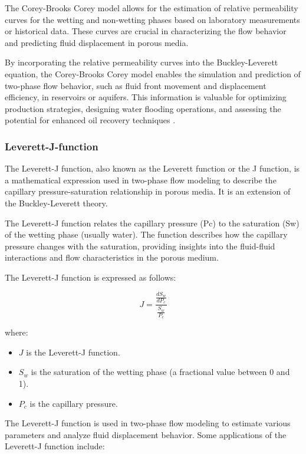 {\begin{itemize}
		\end{itemize}

		The Corey-Brooks Corey model allows for the estimation of relative permeability curves for the wetting and non-wetting phases based on laboratory measurements or historical data. These curves are crucial in characterizing the flow behavior and predicting fluid displacement in porous media.
		
		By incorporating the relative permeability curves into the Buckley-Leverett equation, the Corey-Brooks Corey model enables the simulation and prediction of two-phase flow behavior, such as fluid front movement and displacement efficiency, in reservoirs or aquifers. This information is valuable for optimizing production strategies, designing water flooding operations, and assessing the potential for enhanced oil recovery techniques \cite{tryggvason2001front}.

	\subsubsection{ Leverett-J-function}
		The Leverett-J function, also known as the Leverett function or the J function, is a mathematical expression used in two-phase flow modeling to describe the capillary pressure-saturation relationship in porous media. It is an extension of the Buckley-Leverett theory. 

		The Leverett-J function relates the capillary pressure (Pc) to the saturation (Sw) of the wetting phase (usually water). The function describes how the capillary pressure changes with the saturation, providing insights into the fluid-fluid interactions and flow characteristics in the porous medium.
		
		The Leverett-J function is expressed as follows:

		\[ J = \frac{{\frac{{dS_w}}{{dP_c}}}}{{\frac{{S_w}}{{P_c}}}} \]

		where:
		\begin{itemize}
			\item 	 \( J \) is the Leverett-J function.
			
			\item \( S_w \) is the saturation of the wetting phase (a fractional value between 0 and 1).
			
			\item \( P_c \) is the capillary pressure.
			
		\end{itemize}

		The Leverett-J function is used in two-phase flow modeling to estimate various parameters and analyze fluid displacement behavior. Some applications of the Leverett-J function include:
		
}
